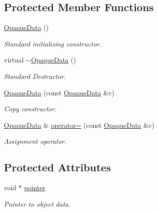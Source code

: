 \subsection*{Protected Member Functions}
\begin{DoxyCompactItemize}
\item 
\hyperlink{class_d_d4hep_1_1_opaque_data_a7651964645b371a757c78163ce663fd2}{OpaqueData} ()
\begin{DoxyCompactList}\small\item\em Standard initializing constructor. \item\end{DoxyCompactList}\item 
virtual \hyperlink{class_d_d4hep_1_1_opaque_data_aff696a10919b804f7bb347f9430b39b3}{$\sim$OpaqueData} ()
\begin{DoxyCompactList}\small\item\em Standard Destructor. \item\end{DoxyCompactList}\item 
\hyperlink{class_d_d4hep_1_1_opaque_data_ae734cb8604b7f256cfd66e4e460913d3}{OpaqueData} (const \hyperlink{class_d_d4hep_1_1_opaque_data}{OpaqueData} \&c)
\begin{DoxyCompactList}\small\item\em Copy constructor. \item\end{DoxyCompactList}\item 
\hyperlink{class_d_d4hep_1_1_opaque_data}{OpaqueData} \& \hyperlink{class_d_d4hep_1_1_opaque_data_ab939ef76406d35f26e6913a392741e72}{operator=} (const \hyperlink{class_d_d4hep_1_1_opaque_data}{OpaqueData} \&c)
\begin{DoxyCompactList}\small\item\em Assignment operator. \item\end{DoxyCompactList}\end{DoxyCompactItemize}
\subsection*{Protected Attributes}
\begin{DoxyCompactItemize}
\item 
void $\ast$ \hyperlink{class_d_d4hep_1_1_opaque_data_af7f449f3359f7f7a7190e6c9467d01fe}{pointer}
\begin{DoxyCompactList}\small\item\em Pointer to object data. \item\end{DoxyCompactList}\end{DoxyCompactItemize}


